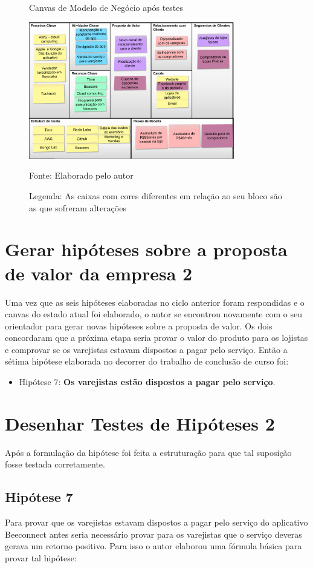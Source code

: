 \begin{figure}[H]
\caption{Canvas de Modelo de Negócio após testes}
\centerline{\includegraphics[width=0.8\textwidth]{img/canvas_beeconnect_2}}
\label{fig:canvas_beeconnect_2}
\caption* {Fonte: Elaborado pelo autor}
\caption* {Legenda: As caixas com cores diferentes em relação ao seu bloco são as que sofreram alterações}
\end{figure}

\section{Gerar hipóteses sobre a proposta de valor da empresa 2}
\label{cha:gerar_hipoteses_ 2}
Uma vez que as seis hipóteses elaboradas no ciclo anterior foram respondidas e o canvas do estado atual foi elaborado, o autor se encontrou novamente com o seu orientador para gerar novas hipóteses sobre a proposta de valor. Os dois concordaram que a próxima etapa seria provar o valor do produto para os lojistas e comprovar se os varejistas estavam dispostos a pagar pelo serviço. Então a sétima hipótese elaborada no decorrer do trabalho de conclusão de curso foi:
\begin{itemize}
\item Hipótese 7: \textbf{Os varejistas estão dispostos a pagar pelo serviço}.
\end{itemize}


\section{Desenhar Testes de Hipóteses 2}
\label{cha:desenhar_hipoteses_2}
Após a formulação da hipótese foi feita a estruturação para que tal suposição fosse testada corretamente.

\subsection{Hipótese 7}
\label{cha:hipotese_7}
Para provar que os varejistas estavam dispostos a pagar pelo serviço do aplicativo Beeconnect antes seria necessário provar para os varejistas que o serviço deveras gerava um retorno positivo. Para isso o autor elaborou uma fórmula básica para provar tal hipótese:

